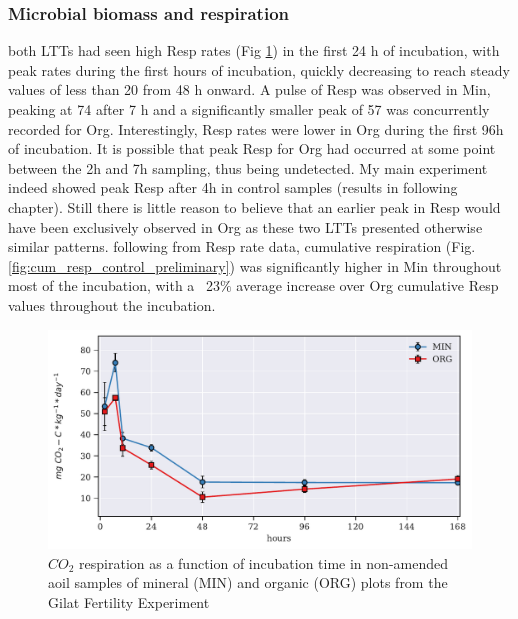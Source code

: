         \subsubsection{Microbial biomass and respiration}
            both LTTs had seen high Resp rates (Fig \ref{fig:resp_control_preliminary}) in the first 24 h of incubation, with peak rates during the first hours of incubation, quickly decreasing to reach steady values of less than 20 \respunit from 48 h onward. A pulse of Resp was observed in Min, peaking at 74   \respunit after 7 h and a significantly smaller peak of 57 \respunit was concurrently recorded for Org. Interestingly, Resp rates were lower in Org during the first 96h of incubation. It is possible that peak Resp for Org had occurred at some point between the 2h and 7h  sampling, thus being undetected. My main experiment indeed showed peak Resp after 4h in control samples (results in following chapter). Still there is little reason to believe that an earlier peak in Resp would have been exclusively observed in Org as these two LTTs presented otherwise similar patterns.
            following from Resp rate data, cumulative respiration (Fig. \ref{fig:cum_resp_control_preliminary}) was significantly higher in Min throughout most of the incubation, with a ~23$\%$ average increase over Org cumulative Resp values throughout the incubation.\\

  			 \begin{figure}[H]
  				\centering
  				\includegraphics[scale=0.8]{thesis_figures/preliminary/control/Resp.pdf}
  				\caption{$CO_2$ respiration as a function of incubation time in non-amended aoil samples of mineral (MIN) and organic (ORG) plots from the Gilat Fertility Experiment}
  				\label{fig:resp_control_preliminary}
  			\end{figure}

